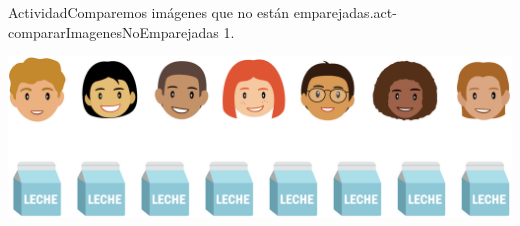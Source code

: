 \documentclass[20pt]{extarticle}
\begin{document}
\begin{activity}{Actividad}{Comparemos imágenes que no están emparejadas.}{act-compararImagenesNoEmparejadas}%
1.%
\begin{image}{0}{0.7}{0.3}{}%
\includegraphics[max width=\linewidth, center]{external/png-source/K.2 V1 Revisions.FacesMilk_Sp_NoLines.png}
\end{image}%
\begin{image}{0}{1}{0}{}%

\end{image}
\end{activity}
\end{document}
